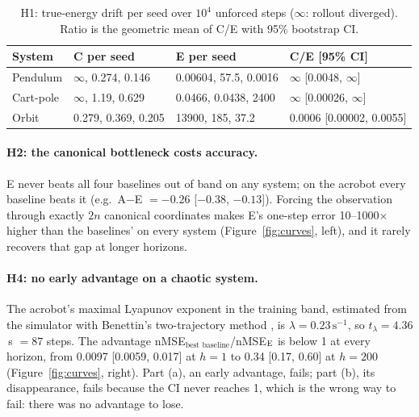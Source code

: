 \documentclass[10pt]{article}
\newcommand{\E}{\textsc{E}}
\begin{document}
\begin{table}[t]
\centering
\small
\caption{H1: true-energy drift per seed over $10^4$ unforced steps ($\infty$: rollout diverged).
Ratio is the geometric mean of C/\E{} with 95\% bootstrap CI.}
\label{tab:h1}
\begin{tabular}{@{}llll@{}}
\toprule
System & C per seed & \E{} per seed & C/\E{} [95\% CI] \\
\midrule
Pendulum  & $\infty$, 0.274, 0.146 & 0.00604, 57.5, 0.0016 & $\infty$ [0.0048, $\infty$] \\
Cart-pole & $\infty$, 1.19, 0.629  & 0.0466, 0.0438, 2400 & $\infty$ [0.00026, $\infty$] \\
Orbit     & 0.279, 0.369, 0.205    & 13900, 185, 37.2     & 0.0006 [0.00002, 0.0055] \\
\bottomrule
\end{tabular}
\end{table}

\paragraph{H2: the canonical bottleneck costs accuracy.} \E{} never beats all four baselines out of band
on any system; on the acrobot every baseline beats it (e.g.\ A$-$\E{} $=-0.26$ [$-0.38$, $-0.13$]).
Forcing the observation through exactly $2n$ canonical coordinates makes \E's one-step error 10--1000$\times$
higher than the baselines' on every system (Figure~\ref{fig:curves}, left), and it rarely recovers that
gap at longer horizons.

\paragraph{H4: no early advantage on a chaotic system.} The acrobot's maximal Lyapunov exponent in the
training band, estimated from the simulator with Benettin's two-trajectory method
\citep{benettin1980lyapunov}, is $\lambda=0.23\,\text{s}^{-1}$, so $t_\lambda=4.36$\,s $=87$ steps.
The advantage nMSE$_\text{best baseline}$/nMSE$_\text{\E}$ is below 1 at every horizon, from
0.0097 [0.0059, 0.017] at $h=1$ to 0.34 [0.17, 0.60] at $h=200$ (Figure~\ref{fig:curves}, right). Part
(a), an early advantage, fails; part (b), its disappearance, fails because the CI never reaches 1, which
is the wrong way to fail: there was no advantage to lose.
\end{document}
